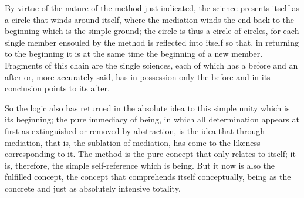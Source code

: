 By virtue of the nature of the method just indicated,
the science presents itself as a circle that winds around itself,
where the mediation winds the end back to the beginning
which is the simple ground;
the circle is thus a circle of circles,
for each single member ensouled by the method
is reflected into itself so that, in returning to the beginning
it is at the same time the beginning of a new member.
Fragments of this chain are the single sciences,
each of which has a before and an after
or, more accurately said,
has in possession only the before
and in its conclusion points to its after.

So the logic also has returned in the absolute idea
to this simple unity which is its beginning;
the pure immediacy of being,
in which all determination appears at first
as extinguished or removed by abstraction,
is the idea that through mediation,
that is, the sublation of mediation,
has come to the likeness corresponding to it.
The method is the pure concept
that only relates to itself;
it is, therefore, the simple self-reference which is being.
But it now is also the fulfilled concept,
the concept that comprehends itself conceptually,
being as the concrete and just as absolutely intensive totality.
